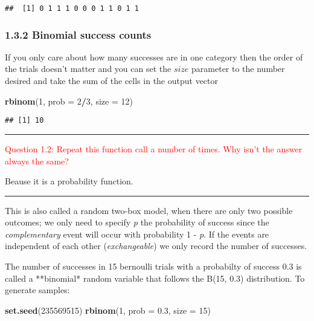 \documentclass[]{article}
\newenvironment{Shaded}{\begin{snugshade}}{\end{snugshade}}
\newcommand{\KeywordTok}[1]{\textcolor[rgb]{0.13,0.29,0.53}{\textbf{#1}}}
\newcommand{\DataTypeTok}[1]{\textcolor[rgb]{0.13,0.29,0.53}{#1}}
\newcommand{\DecValTok}[1]{\textcolor[rgb]{0.00,0.00,0.81}{#1}}
\newcommand{\FloatTok}[1]{\textcolor[rgb]{0.00,0.00,0.81}{#1}}
\newcommand{\OperatorTok}[1]{\textcolor[rgb]{0.81,0.36,0.00}{\textbf{#1}}}
\newcommand{\NormalTok}[1]{#1}
\let\oldrule=\rule
\renewcommand{\rule}[1]{\oldrule{\linewidth}}
\begin{document}
\begin{verbatim}
##  [1] 0 1 1 1 0 0 0 1 1 0 1 1
\end{verbatim}

\subsubsection{1.3.2 Binomial success
counts}\label{binomial-success-counts}

If you only care about how many successes are in one category then the
order of the trials doesn't matter and you can set the \(size\)
parameter to the number desired and take the sum of the cells in the
output vector

\begin{Shaded}
\begin{Highlighting}[]
\KeywordTok{rbinom}\NormalTok{(}\DecValTok{1}\NormalTok{, }\DataTypeTok{prob =} \DecValTok{2}\OperatorTok{/}\DecValTok{3}\NormalTok{, }\DataTypeTok{size =} \DecValTok{12}\NormalTok{)}
\end{Highlighting}
\end{Shaded}

\begin{verbatim}
## [1] 10
\end{verbatim}

\begin{center}\rule{0.5\linewidth}{\linethickness}\end{center}

\textcolor{red}{Question 1.2: Repeat this function call a number of times. Why isn't the answer always the same?}

Beause it is a probability function.

\begin{center}\rule{0.5\linewidth}{\linethickness}\end{center}

This is also called a random two-box model, when there are only two
possible outcomes; we only need to specify \emph{p} the probability of
success since the \emph{complementary} event will occur with probability
1 - \emph{p}. If the events are independent of each other
(\emph{exchangeable}) we only record the number of successes.

The number of successes in 15 bernoulli trials with a probabilty of
success 0.3 is called a **binomial* random variable that follows the
B(15, 0.3) distribution. To generate samples:

\begin{Shaded}
\begin{Highlighting}[]
\KeywordTok{set.seed}\NormalTok{(}\DecValTok{235569515}\NormalTok{)}
\KeywordTok{rbinom}\NormalTok{(}\DecValTok{1}\NormalTok{, }\DataTypeTok{prob =} \FloatTok{0.3}\NormalTok{, }\DataTypeTok{size =} \DecValTok{15}\NormalTok{)}
\end{Highlighting}
\end{Shaded}
\end{document}
